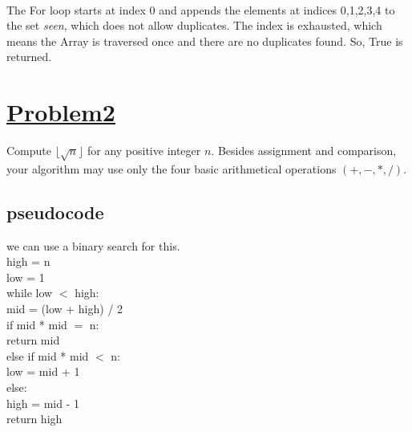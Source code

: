 \documentclass[a4paper,12pt]{article}
\begin{document}
     \paragraph{}
        The For loop starts at index 0 and appends the elements at indices 0,1,2,3,4 to the set \emph{seen}, which does not allow duplicates.
        The index is exhausted, which means the Array is traversed once and there are no duplicates found. So, True is returned.
     
        \section{\underline{\underline{Problem2}}}
    Compute $\lfloor\sqrt{n}\rfloor$ for any positive integer $n$.
    Besides assignment and comparison, your algorithm may use only the four basic
    arithmetical operations $(+,-,*,/)$.
    \subsection{pseudocode}
    \begin{tabbing}
        we can use a binary search for this.\\
    high = n\\
    low = 1\\
    while low $<$ high:\\
    \hspace{1em}mid = (low + high) / 2\\
    \hspace{1em}if mid * mid $=$ n:\\
    \hspace{2em}return mid\\
    \hspace{1em}else if mid * mid $<$ n:\\
    \hspace{2em}low = mid + 1\\
    \hspace{1em}else:\\
    \hspace{2em}high = mid - 1\\
    return high
    \end{tabbing}
\end{document}
